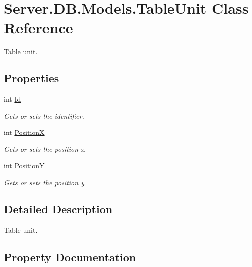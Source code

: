 \hypertarget{classServer_1_1DB_1_1Models_1_1TableUnit}{}\section{Server.\+D\+B.\+Models.\+Table\+Unit Class Reference}
\label{classServer_1_1DB_1_1Models_1_1TableUnit}


Table unit.  


\subsection*{Properties}
\begin{DoxyCompactItemize}
\item 
int \hyperlink{classServer_1_1DB_1_1Models_1_1TableUnit_a6b41f5c204d9a336e057de1ea5bc7602}{Id}
\begin{DoxyCompactList}\small\item\em Gets or sets the identifier. \end{DoxyCompactList}\item 
int \hyperlink{classServer_1_1DB_1_1Models_1_1TableUnit_ac3f6fbba28d575332fb8272acea1ede7}{Position\+X}
\begin{DoxyCompactList}\small\item\em Gets or sets the position x. \end{DoxyCompactList}\item 
int \hyperlink{classServer_1_1DB_1_1Models_1_1TableUnit_a9f536f4d39ce82ef7071734b2037fde8}{Position\+Y}
\begin{DoxyCompactList}\small\item\em Gets or sets the position y. \end{DoxyCompactList}\end{DoxyCompactItemize}


\subsection{Detailed Description}
Table unit. 



\subsection{Property Documentation}
\hypertarget{classServer_1_1DB_1_1Models_1_1TableUnit_a6b41f5c204d9a336e057de1ea5bc7602}{}
